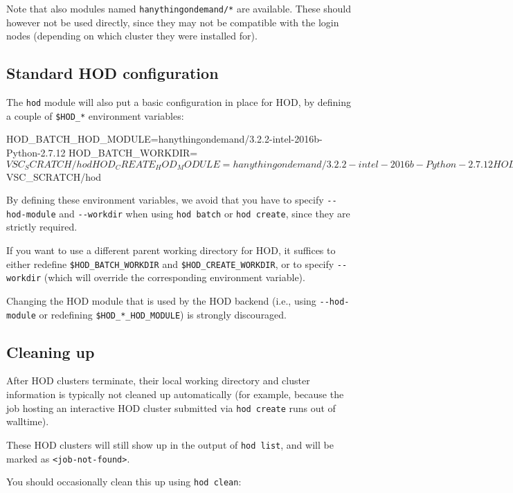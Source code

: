Note that also modules named \lstinline|hanythingondemand/*| are available. These should
however not be used directly, since they may not be compatible with the login nodes
(depending on which cluster they were installed for).

\subsection{Standard HOD configuration}

The \lstinline|hod| module will also put a basic configuration in place for HOD, by defining a couple of
\lstinline|$HOD_*| environment variables:

\begin{prompt}
HOD_BATCH_HOD_MODULE=hanythingondemand/3.2.2-intel-2016b-Python-2.7.12
HOD_BATCH_WORKDIR=$VSC_SCRATCH/hod
HOD_CREATE_HOD_MODULE=hanythingondemand/3.2.2-intel-2016b-Python-2.7.12
HOD_CREATE_WORKDIR=$VSC_SCRATCH/hod
\end{prompt}

By defining these environment variables, we avoid that you have to specify \lstinline|--hod-module|
and \lstinline|--workdir| when using \lstinline|hod batch| or \lstinline|hod create|, since they are strictly required.

If you want to use a different parent working directory for HOD, it suffices to
either redefine \lstinline|$HOD_BATCH_WORKDIR| and \lstinline|$HOD_CREATE_WORKDIR|,
or to specify \lstinline|--workdir| (which will override the corresponding environment variable).

Changing the HOD module that is used by the HOD backend (i.e., using \lstinline|--hod-module|
or redefining \lstinline|$HOD_*_HOD_MODULE|) is strongly discouraged.

\subsection{Cleaning up}

After HOD clusters terminate, their local working directory and cluster information
is typically not cleaned up automatically (for example, because the job hosting an
interactive HOD cluster submitted via \lstinline|hod create| runs out of walltime).

These HOD clusters will still show up in the output of \lstinline|hod list|, and will be marked as \lstinline|<job-not-found>|.

You should occasionally clean this up using \lstinline|hod clean|:

